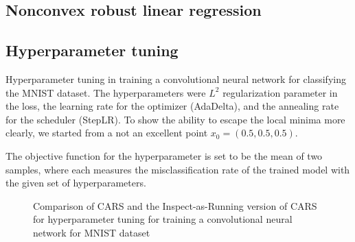 \documentclass[sn-mathphys,Numbered]{sn-jnl}
\theoremstyle{thmstyleone}
\theoremstyle{thmstyletwo}
\theoremstyle{thmstylethree}
\begin{document}
\subsection{Nonconvex robust linear regression}

\subsection{Hyperparameter tuning}
Hyperparameter tuning in training a convolutional neural network for classifying the MNIST dataset.
The hyperparameters were $L^2$ regularization parameter in the loss, the learning rate for the optimizer (AdaDelta), and the annealing rate for the scheduler (StepLR). To show the ability to escape the local minima more clearly, we started from a not an excellent point $x_0 = (0.5, 0.5, 0.5)$.

The objective function for the hyperparameter is set to be the mean of two samples, where each measures the misclassification rate of the trained model with the given set of hyperparameters.

\begin{figure}
    \centering
    \caption{Comparison of CARS and the Inspect-as-Running version of CARS for hyperparameter tuning for training a convolutional neural network for MNIST dataset}
    \label{fig: HP Tuning - MNIST}
\end{figure}
\end{document}
